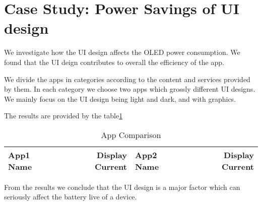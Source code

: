 \section{Case Study: Power Savings of UI design}
\label{sec:caseui}


We investigate how the UI design affects the OLED power consumption. We found
that the UI deign contributes to overall the efficiency of the app.

We divide the apps in  categories according to the content and 
services provided by them. In each category we choose two apps which grossly
different UI designs. We mainly focus on the UI design being light and dark,
and with graphics.

The results are provided by the table\ref{tab:category_app_comparison}
\begin{table}[]
	\centering
	\caption{App Comparison}
	\begin{tabular*}{\columnwidth}{ | l | r | l | r | }
		\hline
		App1 Name & Display Current & App2 Name & Display Current \\
		\hline
		\hline
	\end{tabular*}
	\label{tab:category_app_comparison}
\end{table}


From the results we conclude that the UI design is a major factor which can
seriously affect the battery live of a device.
